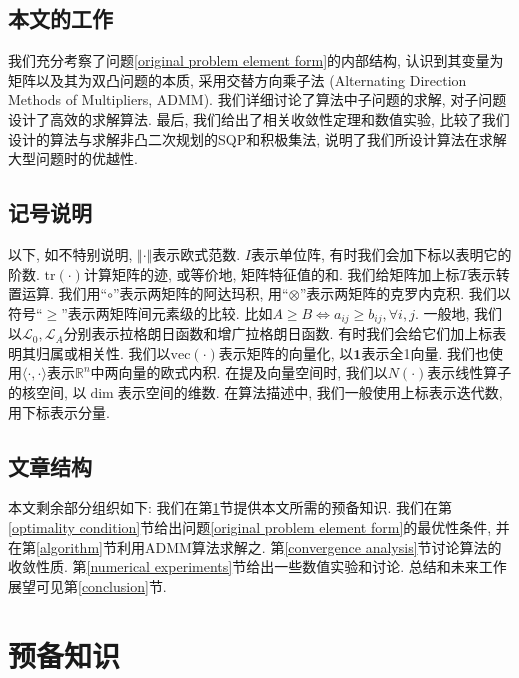 \documentclass[UTF8,10.5pt,a4paper]{ctexart}
\theoremstyle{definition}
\theoremstyle{definition}
\newcommand{\trace}{\mathrm{tr}}
\newcommand{\vectorize}{\mathrm{vec}}
\newcommand{\mcL}{\mathcal{L}}
\newcommand{\one}{\mathbf{1}}
\begin{document}
\subsection{本文的工作}
我们充分考察了问题\eqref{original problem element form}的内部结构, 认识到其变量为矩阵以及其为双凸问题的本质, 采用交替方向乘子法 (Alternating Direction Methods of Multipliers, ADMM). 我们详细讨论了算法中子问题的求解, 对子问题设计了高效的求解算法. 最后, 我们给出了相关收敛性定理和数值实验, 比较了我们设计的算法与求解非凸二次规划的SQP和积极集法, 说明了我们所设计算法在求解大型问题时的优越性. 
\subsection{记号说明}
以下, 如不特别说明, $\Vert\cdot\Vert$表示欧式范数. $I$表示单位阵, 有时我们会加下标以表明它的阶数. $\trace(\cdot)$计算矩阵的迹, 或等价地, 矩阵特征值的和. 我们给矩阵加上标$T$表示转置运算. 我们用``$\circ$''表示两矩阵的阿达玛积, 用``$\otimes$''表示两矩阵的克罗内克积. 我们以符号``$\ge$''表示两矩阵间元素级的比较. 比如$A\ge B\Leftrightarrow a_{ij}\ge b_{ij},\forall i,j$. 一般地, 我们以$\mcL_0,\mcL_A$分别表示拉格朗日函数和增广拉格朗日函数. 有时我们会给它们加上标表明其归属或相关性. 我们以$\vectorize(\cdot)$表示矩阵的向量化, 以$\one$表示全1向量. 我们也使用$\langle\cdot,\cdot\rangle$表示$\mathbb{R}^n$中两向量的欧式内积. 在提及向量空间时, 我们以$N(\cdot)$表示线性算子的核空间, 以$\dim$表示空间的维数. 在算法描述中, 我们一般使用上标表示迭代数, 用下标表示分量.
\subsection{文章结构}
本文剩余部分组织如下: 我们在第\ref{preliminaries}节提供本文所需的预备知识. 我们在第\ref{optimality condition}节给出问题\eqref{original problem element form}的最优性条件, 并在第\ref{algorithm}节利用ADMM算法求解之. 第\ref{convergence analysis}节讨论算法的收敛性质. 第\ref{numerical experiments}节给出一些数值实验和讨论. 总结和未来工作展望可见第\ref{conclusion}节.

\newpage
\section{预备知识}\label{preliminaries}
\end{document}
